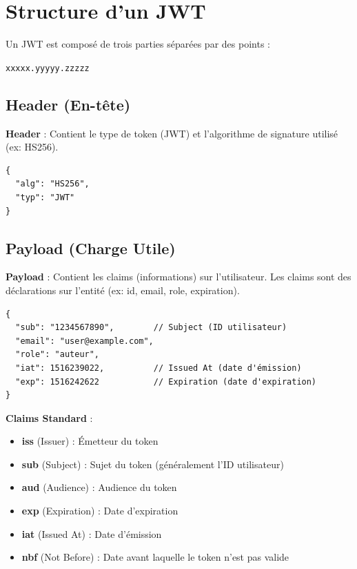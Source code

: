 \section{Structure d'un JWT}

Un JWT est composé de trois parties séparées par des points :

\texttt{xxxxx.yyyyy.zzzzz}

\subsection{Header (En-tête)}

\begin{definitionbox}
    \textbf{Header} : Contient le type de token (JWT) et l'algorithme de signature utilisé (ex: HS256).
\end{definitionbox}

\begin{lstlisting}[style=javascript]
{
  "alg": "HS256",
  "typ": "JWT"
}
\end{lstlisting}

\subsection{Payload (Charge Utile)}

\begin{definitionbox}
    \textbf{Payload} : Contient les claims (informations) sur l'utilisateur. Les claims sont des déclarations sur l'entité (ex: id, email, role, expiration).
\end{definitionbox}

\begin{lstlisting}[style=javascript]
{
  "sub": "1234567890",        // Subject (ID utilisateur)
  "email": "user@example.com",
  "role": "auteur",
  "iat": 1516239022,          // Issued At (date d'émission)
  "exp": 1516242622           // Expiration (date d'expiration)
}
\end{lstlisting}

\begin{definitionbox}
    \textbf{Claims Standard} :
    \begin{itemize}
        \item \textbf{iss} (Issuer) : Émetteur du token
        \item \textbf{sub} (Subject) : Sujet du token (généralement l'ID utilisateur)
        \item \textbf{aud} (Audience) : Audience du token
        \item \textbf{exp} (Expiration) : Date d'expiration
        \item \textbf{iat} (Issued At) : Date d'émission
        \item \textbf{nbf} (Not Before) : Date avant laquelle le token n'est pas valide
    \end{itemize}
\end{definitionbox}

